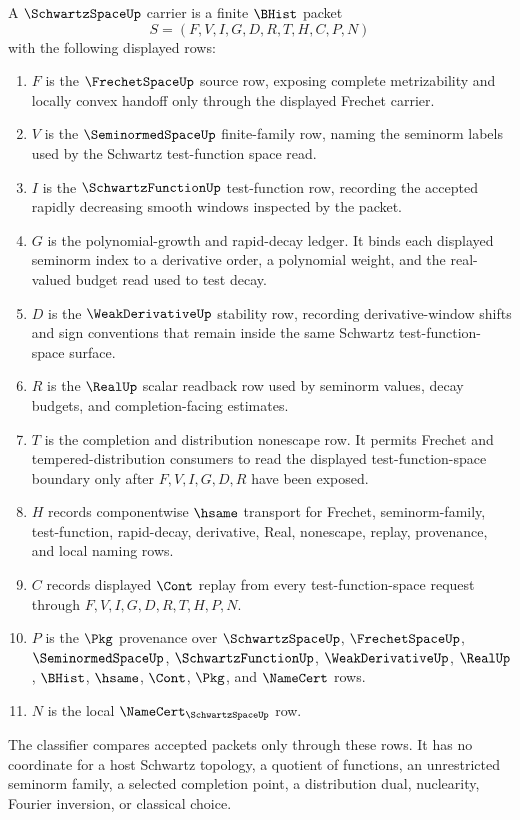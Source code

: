 \begin{definition}
\label{def:schwartz-space-carrier}
A $\SchwartzSpaceUp$ carrier is a finite $\BHist$ packet
$$
S=(F,V,I,G,D,R,T,H,C,P,N)
$$
with the following displayed rows:
\begin{enumerate}
\item $F$ is the $\FrechetSpaceUp$ source row, exposing complete metrizability and locally convex handoff only through the displayed Frechet carrier.
\item $V$ is the $\SeminormedSpaceUp$ finite-family row, naming the seminorm labels used by the Schwartz test-function space read.
\item $I$ is the $\SchwartzFunctionUp$ test-function row, recording the accepted rapidly decreasing smooth windows inspected by the packet.
\item $G$ is the polynomial-growth and rapid-decay ledger. It binds each displayed seminorm index to a derivative order, a polynomial weight, and the real-valued budget read used to test decay.
\item $D$ is the $\WeakDerivativeUp$ stability row, recording derivative-window shifts and sign conventions that remain inside the same Schwartz test-function-space surface.
\item $R$ is the $\RealUp$ scalar readback row used by seminorm values, decay budgets, and completion-facing estimates.
\item $T$ is the completion and distribution nonescape row. It permits Frechet and tempered-distribution consumers to read the displayed test-function-space boundary only after $F,V,I,G,D,R$ have been exposed.
\item $H$ records componentwise $\hsame$ transport for Frechet, seminorm-family, test-function, rapid-decay, derivative, Real, nonescape, replay, provenance, and local naming rows.
\item $C$ records displayed $\Cont$ replay from every test-function-space request through $F,V,I,G,D,R,T,H,P,N$.
\item $P$ is the $\Pkg$ provenance over $\SchwartzSpaceUp$, $\FrechetSpaceUp$, $\SeminormedSpaceUp$, $\SchwartzFunctionUp$, $\WeakDerivativeUp$, $\RealUp$, $\BHist$, $\hsame$, $\Cont$, $\Pkg$, and $\NameCert$ rows.
\item $N$ is the local $\NameCert_{\SchwartzSpaceUp}$ row.
\end{enumerate}
The classifier compares accepted packets only through these rows. It has no coordinate for a host Schwartz topology, a quotient of functions, an unrestricted seminorm family, a selected completion point, a distribution dual, nuclearity, Fourier inversion, or classical choice.
\end{definition}

